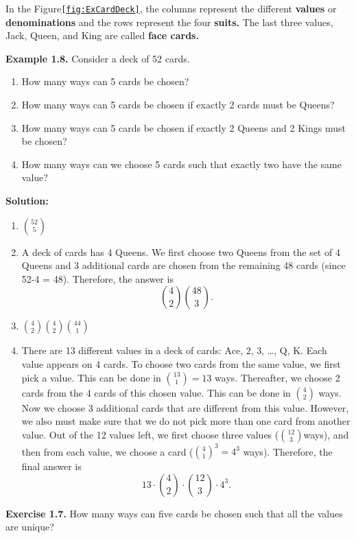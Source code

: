 \documentclass[
  12pt,
]{krantzNoCorner}
\providecommand{\tightlist}{%
  \setlength{\itemsep}{0pt}\setlength{\parskip}{0pt}}
\begin{document}
In the Figure\texttt{\ref{fig:ExCardDeck}}, the columns represent the different
\textbf{values} or \textbf{denominations} and the rows represent the four
\textbf{suits.} The last three values, Jack, Queen, and King are called
\textbf{face cards.}

\textbf{Example 1.8.} Consider a deck of 52 cards.

\begin{enumerate}
\def\labelenumi{\arabic{enumi}.}
\tightlist
\item
  How many ways can 5 cards be chosen?
\item
  How many ways can 5 cards be chosen if exactly 2 cards must be
  Queens?
\item
  How many ways can 5 cards be chosen if exactly 2 Queens and 2 Kings
  must be chosen?
\item
  How many ways can we choose 5 cards such that exactly two have the
  same value?
\end{enumerate}

\textbf{Solution:}

\begin{enumerate}
\def\labelenumi{\arabic{enumi}.}
\item
  \(\binom{52}{5}\)
\item
  A deck of cards has 4 Queens. We first choose two Queens from the
  set of 4 Queens and 3 additional cards are chosen from the remaining
  48 cards (since 52-4 = 48). Therefore, the answer is
  \[\binom{4}{2}\binom{48}{3}.\]
\item
  \(\binom{4}{2}\binom{4}{2}\binom{44}{1}\)
\item
  There are 13 different values in a deck of cards: Ace, 2, 3, \ldots,
  Q, K. Each value appears on 4 cards. To choose two cards from the
  same value, we first pick a value. This can be done in
  \(\binom{13}{1}=13\) ways. Thereafter, we choose 2 cards from the 4
  cards of this chosen value. This can be done in \(\binom{4}{2}\) ways.
  Now we choose 3 additional cards that are different from this value.
  However, we also must make sure that we do not pick more than one
  card from another value. Out of the 12 values left, we first choose
  three values (\(\binom{12}{3}\)ways), and then from each value, we
  choose a card (\(\binom{4}{1}^3=4^3\) ways). Therefore, the final
  answer is \[13\cdot\binom{4}{2}\cdot \binom{12}{3}\cdot 4^3.\]
\end{enumerate}

\textbf{Exercise 1.7.} How many ways can five cards be chosen such that all
the values are unique?
\end{document}
